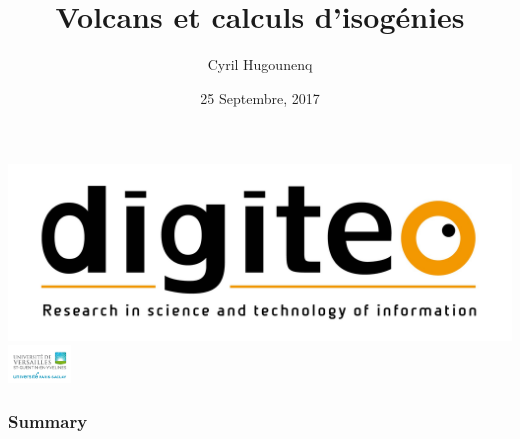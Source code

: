\documentclass[10pt,a4paper]{beamer}
\theoremstyle{plain}
\theoremstyle{definition}
\theoremstyle{definition}
\theoremstyle{definition}
\theoremstyle{definition}
\theoremstyle{remark}
\theoremstyle{remark}
\begin{document}
\author{
Cyril Hugounenq
}
\title[Volcans et calculs d'isogénies]{
Volcans et calculs d'isogénies}
\date{25 Septembre, 2017}


\begin{frame}
\titlepage

\hfill
\includegraphics[scale=0.1]{Images/digiteo.jpg}\hfill
\includegraphics[height=10mm]{Images/uvsq-logo-cmjn.jpg}
\end{frame}
\begin{frame}
\frametitle{Summary}
\tableofcontents
\end{frame}

\end{document}

